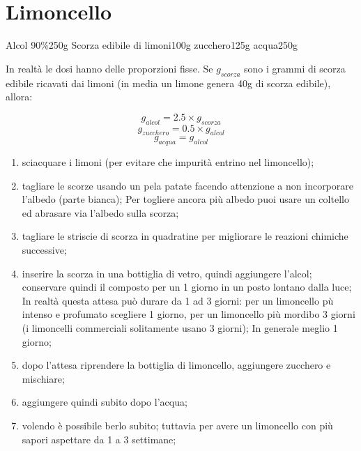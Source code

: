 \section{Limoncello}

\generalRecipeInfos{}

\ingredienti%
    {Alcol 90\%}{250g}%
    {Scorza edibile di limoni}{100g}%
    {zucchero}{125g}%
    {acqua}{250g}%


In realtà le dosi hanno delle proporzioni fisse\cite{bressanini-2018a}. Se $g_{scorza}$ sono i grammi di scorza edibile ricavati dai limoni (in media un limone genera 40g di scorza edibile), allora:

$$g_{alcol} = 2.5 \times g_{scorza}$$
$$g_{zucchero} = 0.5 \times g_{alcol}$$
$$g_{acqua} = g_{alcol}$$

\begin{enumerate}
	\item sciacquare i limoni (per evitare che impurità entrino nel limoncello);
	\item tagliare le scorze usando un pela patate facendo attenzione a non incorporare l'albedo (parte bianca); Per togliere ancora più albedo puoi usare un coltello ed abrasare via l'albedo sulla scorza;
	\item tagliare le striscie di scorza in quadratine per migliorare le reazioni chimiche successive;
	\item inserire la scorza in una bottiglia di vetro, quindi aggiungere l'alcol; conservare quindi il composto per un 1 giorno in un posto lontano dalla luce; In realtà
		questa attesa può durare da 1 ad 3 giorni: per un limoncello pù intenso e profumato scegliere 1 giorno, per un limoncello più mordibo 3 giorni (i limoncelli commerciali solitamente usano 3 giorni);
		In generale meglio 1 giorno;
	\item dopo l'attesa riprendere la bottiglia di limoncello, aggiungere zucchero e mischiare;
	\item aggiungere quindi subito dopo l'acqua;

	\item volendo è possibile berlo subito; tuttavia per avere un limoncello con più sapori aspettare da 1 a 3 settimane;
\end{enumerate}

